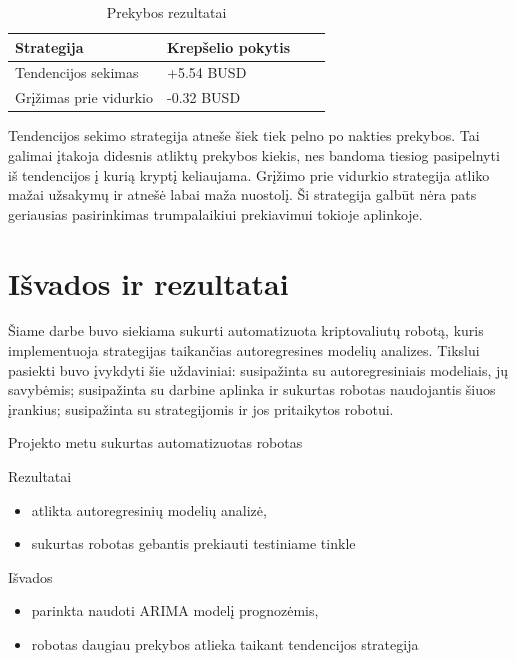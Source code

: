 \documentclass{VUMIFInfKursinis}
\begin{document}
\begin{table}[H]
  \centering
  \begin{tabularx}{\linewidth}{|X|X|X|X|}
    \hline
    Strategija             & Krepšelio pokytis \\
    \hline
    Tendencijos sekimas    & +5.54 BUSD        \\
    \hline
    Grįžimas prie vidurkio & -0.32 BUSD        \\
    \hline
  \end{tabularx}
  \caption{Prekybos rezultatai}
  \label{table:preykos_rezultatai}
\end{table}

Tendencijos sekimo strategija atneše šiek tiek pelno po nakties prekybos. Tai galimai įtakoja didesnis atliktų prekybos kiekis, nes bandoma tiesiog pasipelnyti iš tendencijos į kurią kryptį keliaujama. Grįžimo prie vidurkio strategija atliko 
mažai užsakymų ir atnešė labai maža nuostolį. Ši strategija galbūt nėra pats geriausias pasirinkimas trumpalaikiui prekiavimui
tokioje aplinkoje.

\section{Išvados ir rezultatai}

Šiame darbe buvo siekiama sukurti automatizuota kriptovaliutų robotą, kuris implementuoja strategijas taikančias autoregresines modelių analizes.
Tikslui pasiekti buvo įvykdyti šie uždaviniai: susipažinta su autoregresiniais modeliais, jų savybėmis; susipažinta su darbine aplinka ir sukurtas
robotas naudojantis šiuos įrankius; susipažinta su strategijomis ir jos pritaikytos robotui. 

Projekto metu sukurtas automatizuotas robotas

Rezultatai
\begin{itemize}
  \item atlikta autoregresinių modelių analizė,
  \item sukurtas robotas gebantis prekiauti testiniame tinkle
\end{itemize}

Išvados
\begin{itemize}
  \item parinkta naudoti ARIMA modelį prognozėmis,
  \item robotas daugiau prekybos atlieka taikant tendencijos strategija
\end{itemize}
\end{document}
